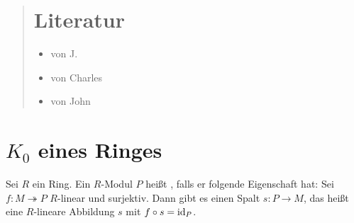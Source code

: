 
\newcommand{\fach}{Algebraische $K$-Theorie}
\newcommand{\semester}{Sose 2016}
\newcommand{\homepage}{https://wwwmath.uni-muenster.de/reine/u/topos/lehre/WS2015-2016/Topologie2/}

\newcommand{\prof}{Prof.\ Dr.\ Arthur Bartels}
\publishers{}



\maketitle
\begin{abstract}

\section*{Literatur}
\begin{itemize}
	\item {} von J. \citeauthor{Rosenberg} \cite{Rosenberg}
	\item {} von Charles \citeauthor{Weibel} \cite{Weibel}
	\item {} von John \citeauthor{MilnorKtheory} \cite{MilnorKtheory}
\end{itemize}
\end{abstract}

\tableofcontents
\cleardoubleoddemptypage

\setcounter{page}{1}
\setcounter{footnote}{0}

\section{$K_0$ eines Ringes} %
\label{sec:k_0_eines_ringes}

\begin{definition}[{name=[{projektiv}]}]
	Sei $R$ ein Ring.
	Ein $R$-Modul $P$ heißt , falls er folgende Eigenschaft hat:
	Sei $f \colon M \twoheadrightarrow P$ $R$-linear und surjektiv. 
	Dann gibt es einen Spalt $s \colon P \to M$, das heißt eine $R$-lineare Abbildung $s$ mit $f \circ s = \operatorname{id}_P$.
\end{definition}

